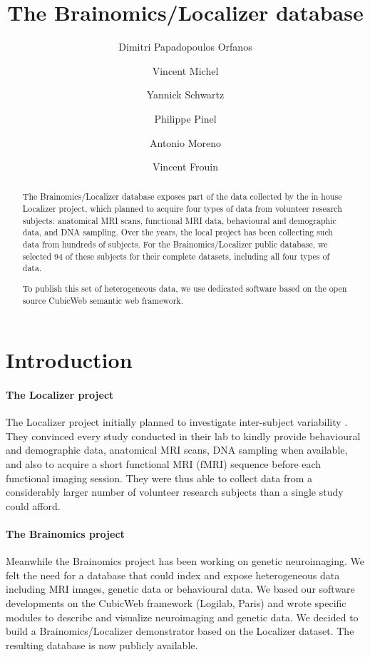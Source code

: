 \documentclass[review]{elsarticle}
\begin{document}
\begin{frontmatter}

\title{The Brainomics/Localizer database}

\author[neurospin]{Dimitri Papadopoulos Orfanos}
\author[logilab]{Vincent Michel}
\author[neurospin]{Yannick Schwartz}
\author[neurospin]{Philippe Pinel}
\author[neurospin]{Antonio Moreno}
\author[neurospin]{Vincent Frouin}

\address[neurospin]{I2BM, Neurospin, CEA/Saclay}
\address[logilab]{Logilab}

\begin{abstract}
The Brainomics/Localizer database exposes part of the data collected by
the in house Localizer project, which planned to acquire four types of
data from volunteer research subjects: anatomical MRI scans, functional MRI
data, behavioural and demographic data, and DNA sampling. Over the years, the
local project has been collecting such data from hundreds of subjects. For the
Brainomics/Localizer public database, we selected 94 of these subjects for their
complete datasets, including all four types of data.

To publish this set of heterogeneous data, we use dedicated software based on
the open source CubicWeb semantic web framework.
\end{abstract}

\end{frontmatter}


\section{Introduction}

\paragraph{The Localizer project} The Localizer project initially planned to investigate inter-subject variability \cite{Pinel2007}. They convinced every study conducted in their lab to kindly provide behavioural and demographic data, anatomical MRI scans, DNA sampling when available, and also to acquire a short functional MRI (fMRI) sequence before each functional imaging session. They were thus able to collect data from a considerably larger number of volunteer research subjects than a single study could afford. 

\paragraph{The Brainomics project} Meanwhile the Brainomics project has been working on genetic neuroimaging. We felt the need for a database that could index and expose heterogeneous data including MRI images, genetic data or behavioural data. We based our software developments on the CubicWeb framework (Logilab, Paris) and wrote specific modules to describe and visualize neuroimaging and genetic data. We decided to build a Brainomics/Localizer demonstrator based on the Localizer dataset. The resulting database is now publicly available.
\end{document}
